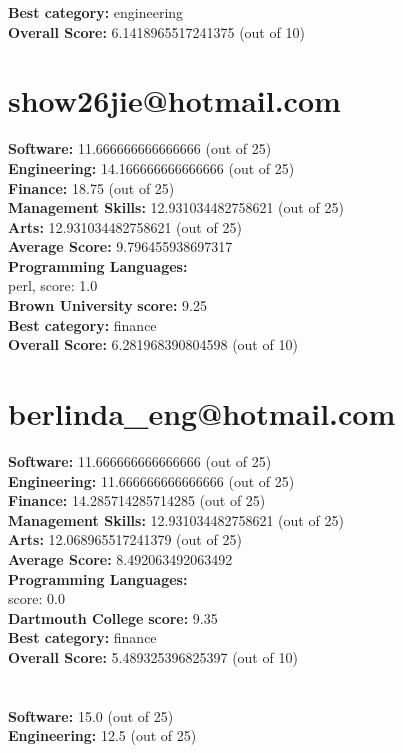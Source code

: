 \documentclass{article}
\begin{document}
\textbf{Best category: } engineering\\
\textbf{Overall Score: }6.1418965517241375 (out of 10)\section{show26jie@hotmail.com}
\textbf{Software:} 11.666666666666666 (out of 25)\\
\textbf{Engineering: } 14.166666666666666 (out of 25)\\
\textbf{Finance:} 18.75 (out of 25)\\
\textbf{Management Skills:} 12.931034482758621 (out of 25)\\
\textbf{Arts:} 12.931034482758621 (out of 25)\\
\textbf{Average Score: } 9.796455938697317\\
\textbf{Programming Languages:} \\
perl, score: 1.0\\
\textbf{Brown University} \textbf{score:} 9.25\\
\textbf{Best category: } finance\\
\textbf{Overall Score: }6.281968390804598 (out of 10)\section{berlinda_eng@hotmail.com}
\textbf{Software:} 11.666666666666666 (out of 25)\\
\textbf{Engineering: } 11.666666666666666 (out of 25)\\
\textbf{Finance:} 14.285714285714285 (out of 25)\\
\textbf{Management Skills:} 12.931034482758621 (out of 25)\\
\textbf{Arts:} 12.068965517241379 (out of 25)\\
\textbf{Average Score: } 8.492063492063492\\
\textbf{Programming Languages:} \\
score: 0.0\\
\textbf{Dartmouth College} \textbf{score:} 9.35\\
\textbf{Best category: } finance\\
\textbf{Overall Score: }5.489325396825397 (out of 10)\section{}
\textbf{Software:} 15.0 (out of 25)\\
\textbf{Engineering: } 12.5 (out of 25)\\
\end{document}

